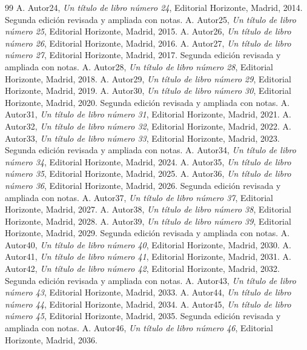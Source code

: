 \documentclass{article}
\begin{document}
\begin{thebibliography}{99}
 A. Autor24, \emph{Un título de libro número 24}, Editorial Horizonte, Madrid, 2014. Segunda edición revisada y ampliada con notas.
 A. Autor25, \emph{Un título de libro número 25}, Editorial Horizonte, Madrid, 2015.
 A. Autor26, \emph{Un título de libro número 26}, Editorial Horizonte, Madrid, 2016.
 A. Autor27, \emph{Un título de libro número 27}, Editorial Horizonte, Madrid, 2017. Segunda edición revisada y ampliada con notas.
 A. Autor28, \emph{Un título de libro número 28}, Editorial Horizonte, Madrid, 2018.
 A. Autor29, \emph{Un título de libro número 29}, Editorial Horizonte, Madrid, 2019.
 A. Autor30, \emph{Un título de libro número 30}, Editorial Horizonte, Madrid, 2020. Segunda edición revisada y ampliada con notas.
 A. Autor31, \emph{Un título de libro número 31}, Editorial Horizonte, Madrid, 2021.
 A. Autor32, \emph{Un título de libro número 32}, Editorial Horizonte, Madrid, 2022.
 A. Autor33, \emph{Un título de libro número 33}, Editorial Horizonte, Madrid, 2023. Segunda edición revisada y ampliada con notas.
 A. Autor34, \emph{Un título de libro número 34}, Editorial Horizonte, Madrid, 2024.
 A. Autor35, \emph{Un título de libro número 35}, Editorial Horizonte, Madrid, 2025.
 A. Autor36, \emph{Un título de libro número 36}, Editorial Horizonte, Madrid, 2026. Segunda edición revisada y ampliada con notas.
 A. Autor37, \emph{Un título de libro número 37}, Editorial Horizonte, Madrid, 2027.
 A. Autor38, \emph{Un título de libro número 38}, Editorial Horizonte, Madrid, 2028.
 A. Autor39, \emph{Un título de libro número 39}, Editorial Horizonte, Madrid, 2029. Segunda edición revisada y ampliada con notas.
 A. Autor40, \emph{Un título de libro número 40}, Editorial Horizonte, Madrid, 2030.
 A. Autor41, \emph{Un título de libro número 41}, Editorial Horizonte, Madrid, 2031.
 A. Autor42, \emph{Un título de libro número 42}, Editorial Horizonte, Madrid, 2032. Segunda edición revisada y ampliada con notas.
 A. Autor43, \emph{Un título de libro número 43}, Editorial Horizonte, Madrid, 2033.
 A. Autor44, \emph{Un título de libro número 44}, Editorial Horizonte, Madrid, 2034.
 A. Autor45, \emph{Un título de libro número 45}, Editorial Horizonte, Madrid, 2035. Segunda edición revisada y ampliada con notas.
 A. Autor46, \emph{Un título de libro número 46}, Editorial Horizonte, Madrid, 2036.

\end{thebibliography}
\end{document}
